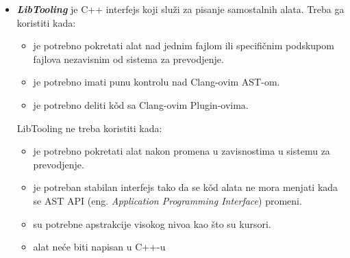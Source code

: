 \documentclass[12pt,oneside]{memoir}
\begin{document}
\begin{itemize}
\item \textit{\textbf{LibTooling}} je C++ interfejs koji slu\v{z}i za pisanje samostalnih alata.
Treba ga koristiti kada:
\begin{itemize}
  \item je potrebno pokretati alat nad jednim fajlom ili specifi\v{c}nim podskupom fajlova nezavisnim od sistema za prevodjenje.
  \item je potrebno imati punu kontrolu nad Clang-ovim AST-om.
  \item je potrebno deliti k\v{o}d sa Clang-ovim Plugin-ovima.
\end{itemize}
LibTooling ne treba koristiti kada:
\begin{itemize}
  \item je potrebno pokretati alat nakon promena u zavisnostima u sistemu za prevodjenje.
  \item je potreban stabilan interfejs tako da se k\v{o}d alata ne mora menjati kada se AST API (eng. \textit{Application Programming Interface}) promeni.
  \item su potrebne apstrakcije visokog nivoa kao \v{s}to su kursori.
  \item alat ne\'{c}e biti napisan u C++-u
\end{itemize}
\end{itemize}













































\end{document}
